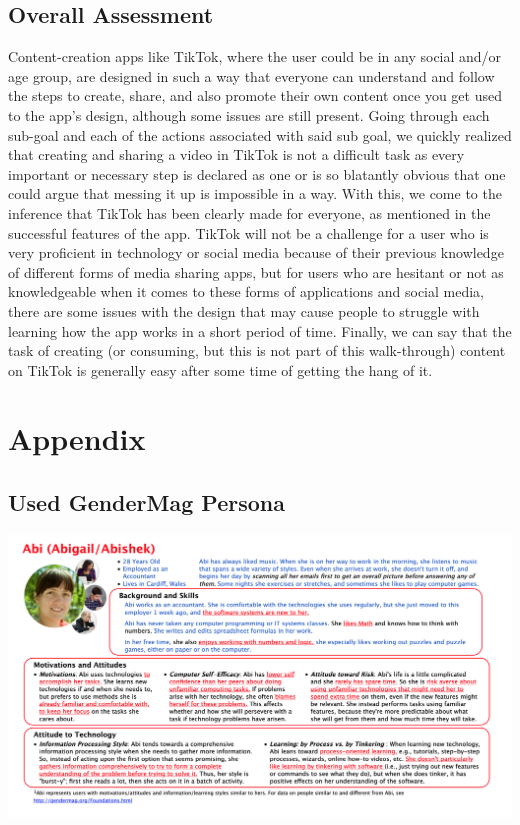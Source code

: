 \documentclass[12pt, letterpaper]{article}
\begin{document}
\subsection{Overall Assessment}
Content-creation apps like TikTok, where the user could be in any social and/or age group, are designed in such a way that everyone can understand and follow the steps to create, share, and also promote their own content once you get used to the app's design, although some issues are still present. Going through each sub-goal and each of the actions associated with said sub goal, we quickly realized that creating and sharing a video in TikTok is not a difficult task as every important or necessary step is declared as one or is so blatantly obvious that one could argue that messing it up is impossible in a way. With this, we come to the inference that TikTok has been clearly made for everyone, as mentioned in the successful features of the app. TikTok will not be a challenge for a user who is very proficient in technology or social media because of their previous knowledge of different forms of media sharing apps, but for users who are hesitant or not as knowledgeable when it comes to these forms of applications and social media, there are some issues with the design that may cause people to struggle with learning how the app works in a short period of time.
Finally, we can say that the task of creating (or consuming, but this is not part of this walk-through) content on TikTok is generally easy after some time of getting the hang of it.
\newpage

\section{Appendix}
\subsection{Used GenderMag Persona}
\includegraphics[scale=0.45]{PDFs/Abby.png}
\newpage
\end{document}

